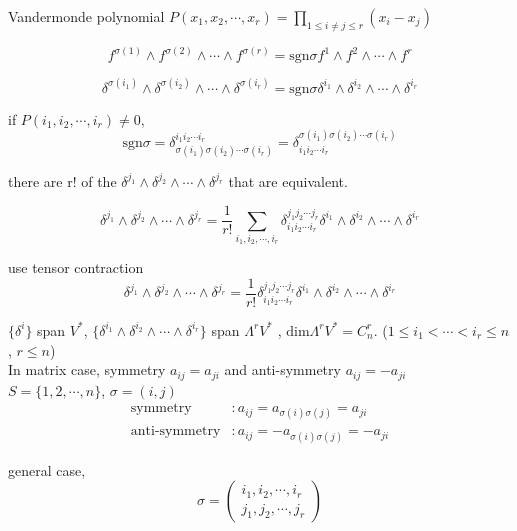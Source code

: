 \documentclass[12pt,a4paper]{article}
\begin{document}
Vandermonde polynomial $P(x_1,x_2,\cdots,x_r) = \prod_{1 \leq i \neq j \leq r}(x_i - x_j)$


\[
	f^{\sigma(1)}\wedge f^{\sigma(2)} \wedge \cdots \wedge f^{\sigma(r)}  = \mathrm{sgn}\sigma f^1\wedge f^2 \wedge \cdots \wedge f^r 
\]

\[
	\delta^{\sigma(i_1)}\wedge \delta^{\sigma(i_2)} \wedge \cdots \wedge \delta^{\sigma(i_r)}  = \mathrm{sgn}\sigma \delta^{i_1}\wedge \delta^{i_2} \wedge \cdots \wedge \delta^{i_r}
\]

if $P(i_1, i_2 ,\cdots , i_r) \neq 0$, 
\[
\mathrm{sgn}\sigma = \delta^{i_1 i_2 \cdots i_r}_{\sigma(i_1) \sigma(i_2) \cdots \sigma(i_r)} = \delta_{i_1 i_2 \cdots i_r}^{\sigma(i_1) \sigma(i_2) \cdots \sigma(i_r)} 
\]

there are r! of the $\delta^{j_1}\wedge \delta^{j_2} \wedge \cdots \wedge \delta^{j_r}$ that are equivalent.


\[
\delta^{j_1}\wedge \delta^{j_2} \wedge \cdots \wedge \delta^{j_r} = \frac{1}{r!}\sum_{i_1,i_2,\cdots,i_r}\delta^{j_1 j_2 \cdots j_r}_{i_1 i_2 \cdots i_r}\delta^{i_1}\wedge \delta^{i_2} \wedge \cdots \wedge \delta^{i_r}
\]

use tensor contraction
\[
\delta^{j_1}\wedge \delta^{j_2} \wedge \cdots \wedge \delta^{j_r} = \frac{1}{r!}\delta^{j_1 j_2 \cdots j_r}_{i_1 i_2 \cdots i_r}\delta^{i_1}\wedge \delta^{i_2} \wedge \cdots \wedge \delta^{i_r}
\]

$\{\delta^i\}$ span $ V^* $, $\{\delta^{i_1} \wedge \delta^{i_2} \wedge \cdots \wedge \delta^{i_r}\}$ span $\Lambda^r V^*$ , $\mathrm{dim} \Lambda^rV^* = C^{r}_{n}$. ($ 1 \leq i_1 < \cdots < i_r \leq n $, $r \leq n$)\\

In matrix case, symmetry $a_{ij} = a_{ji}$ and anti-symmetry $a_{ij} = -a_{ji}$\\


$S = \{1,2,\cdots,n\}$, $\sigma = (i,j)$
\begin{align*}
	\text{symmetry}&:a_{ij} = a_{\sigma(i)\sigma(j)} = a_{ji} \\
	\text{anti-symmetry}&: a_{ij} = -a_{\sigma(i)\sigma(j)} =-a_{ji}
\end{align*}

general case, \\
\[
\sigma = \begin{pmatrix}
i_1,i_2, \cdots, i_r \\
j_1,j_2, \cdots, j_r
\end{pmatrix}
\]
\end{document}
